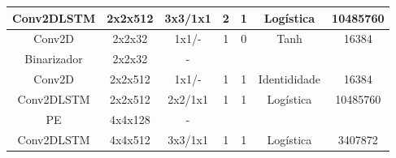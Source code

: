 \begin{table}[htbp]
\begin{adjustbox}{width=\columnwidth,center}
\begin{tabular}{|c|c|c|c|c|c|c|}
			Conv2DLSTM      & 2x2x512                                                              & 3x3/1x1                                                                                 & 2              & 1                  & Logística                                                               & 10485760                                                                \\ \hline
			Conv2D          & 2x2x32                                                               & 1x1/-                                                                                   & 1              & 0                 & Tanh                                                                  & 16384                                                                   \\ \hline
			Binarizador     & 2x2x32                                                               & -                                                                                       &                &                        &                                                                       &                                                                         \\ \hline
			Conv2D          & 2x2x512                                                              & 1x1/-                                                                                   & 1              & 1                  & Identididade                                                          & 16384                                                                   \\ \hline
			Conv2DLSTM      & 2x2x512                                                              & 2x2/1x1                                                                                 & 1              & 1                  & Logística                                                               & 10485760                                                                \\ \hline
			PE             & 4x4x128                                                              & -                                                                                       &                &                        &                                                                       &                                                                         \\ \hline
			Conv2DLSTM      & 4x4x512                                                              & 3x3/1x1                                                                                 & 1              & 1                  & Logística                                                               & 3407872                                                                 \\ \hline

\end{tabular}
\end{adjustbox}
\end{table}
